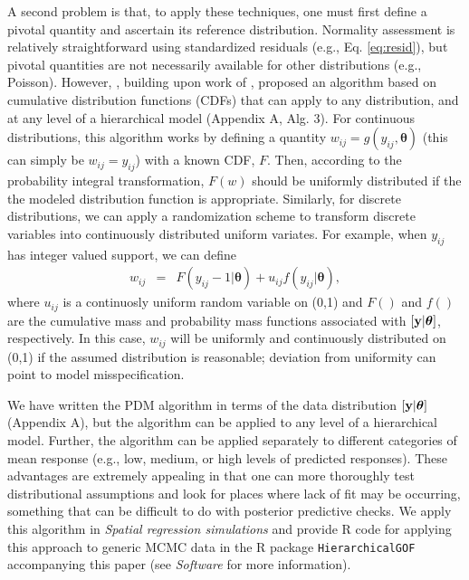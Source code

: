 \documentclass[12pt,english]{article}
\begin{document}
\begin{spacing}{1.9}
A second problem is that, to apply these techniques, one must first
define a pivotal quantity and ascertain its reference
distribution. Normality assessment is relatively straightforward using
standardized residuals (e.g., Eq. \ref{eq:resid}), but pivotal
quantities are not necessarily available for other distributions
(e.g., Poisson).  However, \citet{YuanJohnson2012}, building upon work
of \citet{Johnson2004}, proposed an algorithm based on cumulative
distribution functions (CDFs) that can apply to any distribution, and
at any level of a hierarchical model (Appendix A, Alg. 3).  For
continuous distributions, this algorithm works by defining a quantity
$w_{ij} = g(y_{ij},\boldsymbol{\theta})$ (this can simply be
$w_{ij}=y_{ij}$) with a known CDF, $F$.  Then, according to the
probability integral transformation, $F(w)$ should be uniformly
distributed if the the modeled distribution function is appropriate.
Similarly, for discrete distributions, we can apply a randomization
scheme \citep{Smith1985,YuanJohnson2012} to transform discrete
variables into continuously distributed uniform variates.  For
example, when $y_{ij}$ has integer valued support, we can define
\begin{eqnarray*}
  w_{ij} & = & F(y_{ij}-1|\boldsymbol{\theta}) + u_{ij} f(y_{ij}|\boldsymbol{\theta}),
\end{eqnarray*}
where $u_{ij}$ is a continuosly uniform random variable on (0,1) and
$F()$ and $f()$ are the cumulative mass and probability mass functions
associated with $[{\bf y} | \boldsymbol{\theta}]$, respectively.  In
this case, $w_{ij}$ will be uniformly and continuously distributed on
(0,1) if the assumed distribution is reasonable; deviation from
uniformity can point to model misspecification.

We have written the PDM algorithm in terms of the data distribution
$[{\bf y} | \boldsymbol{\theta}]$ (Appendix A), but the algorithm can
be applied to any level of a hierarchical model. Further, the
algorithm can be applied separately to different categories of mean
response (e.g., low, medium, or high levels of predicted
responses). These advantages are extremely appealing in that one can
more thoroughly test distributional assumptions and look for places
where lack of fit may be occurring, something that can be difficult to
do with posterior predictive checks.  We apply this algorithm in
\textit{Spatial regression simulations} and provide R code for
applying this approach to generic MCMC data in the R package
\texttt{HierarchicalGOF} accompanying this paper (see
\textit{Software} for more information).




\end{spacing}
\end{document}
